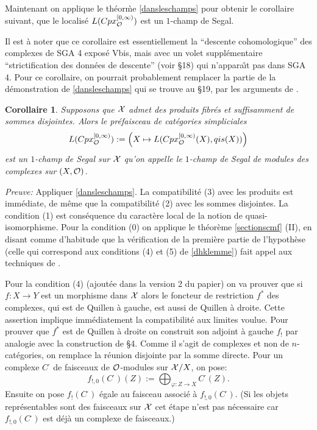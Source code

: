 \documentclass[12pt]{article}
\newtheorem{corollaire}[lemma]{Corollaire}
\newcommand{\Oo}{{\cal O}}
\newcommand{\Xx}{{\cal X}}
\begin{document}
Maintenant on applique le th\'eor\`me
\ref{dansleschamps} pour obtenir le corollaire suivant,
que le localis\'e $L(Cpx_{\Oo}^{[0,\infty )})$
est un $1$-champ de
Segal.

Il est \`a noter
que ce corollaire est
essentiellement la ``descente cohomologique'' des complexes de SGA 4
\cite{SGA4b} expos\'e Vbis,
mais avec un volet
suppl\'ementaire ``strictification des donn\'ees de descente''
(voir \S 18) qui n'appara\^{\i}t pas dans SGA 4. Pour ce corollaire,
on pourrait probablement remplacer la partie de
la d\'emonstration de
\ref{dansleschamps} qui se trouve au \S 19, par les arguments de \cite{SGA4b}.


\begin{corollaire}
\label{cestunchamp}
Supposons que $\Xx$ admet des produits fibr\'es et suffisamment de sommes
disjointes. Alors le pr\'efaisceau de cat\'egories simpliciales
$$
L(Cpx_{\Oo}^{[0,\infty )}):= 
\left( X\mapsto  L(Cpx_{\Oo}^{[0,\infty )}(X), qis(X)) \right)
$$
est un $1$-champ de Segal sur $\Xx$ qu'on appelle le {\em $1$-champ de Segal de
modules des complexes sur $(X,\Oo )$}.
\end{corollaire}
{\em Preuve:} Appliquer \ref{dansleschamps}. La compatibilit\'e (3) avec les
produits est imm\'ediate, de m\^eme que  la compatibilit\'e (2) avec les
sommes disjointes.  La condition (1) est cons\'equence du caract\`ere
local de la
notion de quasi-isomorphisme. Pour la condition (0) on applique le th\'eor\`eme
\ref{sectionscmf}
(II), en disant comme d'habitude que la v\'erification de la premi\`ere
partie de l'hypoth\`ese
(celle qui correspond aux conditions (4) et (5) de \ref{dhklemme}) fait appel
aux techniques de
\cite{Jardine}.


Pour la condition (4) (ajout\'ee dans la version 2 du papier) on va prouver
que si $f: X\rightarrow Y$ est un morphisme dans $\Xx $ alors le foncteur
de restriction $f^{\ast}$ des complexes, qui est de Quillen \`a gauche,
est aussi de Quillen \`a droite. Cette assertion implique imm\'ediatement
la compatibilit\'e aux limites voulue. Pour prouver que $f^{\ast}$
est de Quillen \`a droite on construit son adjoint \`a gauche $f_{!}$ par
analogie avec la construction de \S 4. Comme il s'agit de complexes et non
de $n$-cat\'egories, on remplace la r\'eunion disjointe par la somme directe.
Pour un complexe $C^{\cdot}$ de faisceaux de $\Oo$-modules
sur $\Xx /X$, on pose:
$$
f_{!, 0}(C^{\cdot})(Z) := \bigoplus _{\varphi : Z\rightarrow X}
C^{\cdot} (Z).
$$
Ensuite on pose $f_!(C^{\cdot})$ \'egale au faisceau associ\'e \`a 
$f_{!,0}(C^{\cdot})$. (Si les objets repr\'esentables sont des faisceaux
sur $\Xx$ cet \'etape n'est pas n\'ecessaire car $f_{!,0}(C^{\cdot})$
est d\'ej\`a un complexe de faisceaux.)
\end{document}
